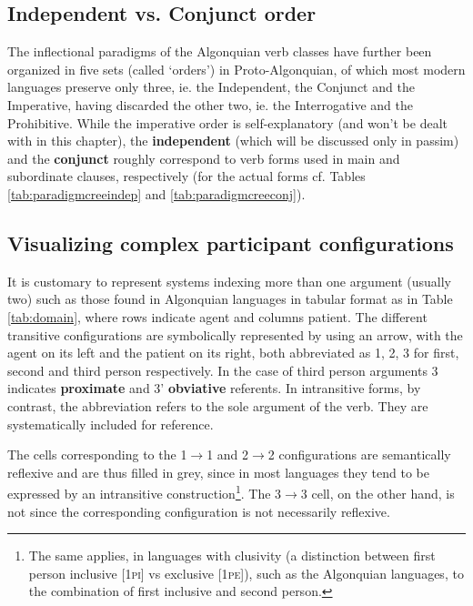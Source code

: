 \documentclass[twoside,a4paper,11pt]{article}
\newcommand{\pli}{\textsc{pi}}
\newcommand{\pe}{\textsc{pe}}
\begin{document}
\subsection{Independent vs. Conjunct order}
The inflectional paradigms of the Algonquian verb classes have further been organized in five sets (called `orders') in Proto-Algonquian, of which most modern languages preserve only three, ie. the Independent, the Conjunct and the Imperative, having discarded the other two, ie. the Interrogative and the Prohibitive. While the imperative order is self-explanatory (and won't be dealt with in this chapter), the \textbf{independent} (which will be discussed only in passim) and the \textbf{conjunct} roughly correspond to verb forms used in main and subordinate clauses, respectively (for the actual forms cf. Tables \ref{tab:paradigmcreeindep} and \ref{tab:paradigmcreeconj}). 

\subsection{Visualizing complex participant configurations}
\label{subsec:visual}
It is customary to represent systems indexing more than one argument (usually two) such as those found in Algonquian languages in tabular format as in Table \ref{tab:domain}, where rows indicate agent and columns patient. The different transitive configurations are symbolically represented by using an arrow, with the agent on its left and the patient on its right, both abbreviated as 1, 2, 3 for first, second and third person respectively. In the case of third person arguments 3 indicates \textbf{proximate} and 3' \textbf{obviative} referents. In intransitive forms, by contrast, the abbreviation refers to the sole argument of the verb. They are systematically included for reference.

The cells corresponding to the 1$\rightarrow$1 and 2$\rightarrow$2 configurations are semantically reflexive and are thus filled in grey, since in most languages they tend to be expressed by an intransitive construction\footnote{The same applies, in languages with clusivity (a distinction between first person inclusive [1\pli] vs exclusive [1\pe]), such as the Algonquian languages, to the combination of first inclusive and second person.}. The 3$\rightarrow$3 cell, on the other hand, is not since the corresponding configuration is not necessarily reflexive.
\end{document}
